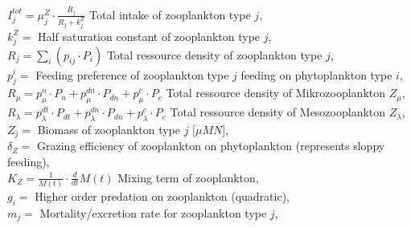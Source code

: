\mbox{} \hspace{.5cm} $I^{tot}_j= \mu^{Z}_j \cdot \frac{R_{j}}{R_{j} + k^Z_j}$ Total intake of zooplankton type $j$,\\
\mbox{} \hspace{.5cm} $k^Z_j =$ Half saturation constant of zooplankton type $j$,\\
\mbox{} \hspace{.5cm} $R_{j}= \sum_{i} (p_{i j} \cdot P_{i})$ Total ressource density of zooplankton type $j$,\\
\mbox{} \hspace{.5cm} $p^i_{j}=$ Feeding preference of zooplankton type $j$ feeding on phytoplankton type $i$,\\
\mbox{} \hspace{.5cm} $R_{\mu}= p^n_{\mu} \cdot P_{n} + p^{dn}_{\mu} \cdot P_{dn} + p^c_{\mu} \cdot P_{c}$ Total ressource density of Mikrozooplankton $Z_{\mu}$,\\
\mbox{} \hspace{.5cm} $R_{\lambda}= p^{dt}_{\lambda} \cdot P_{dt} + p^{dn}_{\lambda} \cdot P_{dn} + p^c_{\lambda} \cdot P_{c}$ Total ressource density of Mesozooplankton $Z_{\lambda}$,\\



\mbox{} \hspace{.5cm} $Z_j=$ Biomass of zooplankton type $j$ [$\mu M N$],\\
\mbox{} \hspace{.5cm} $\delta_{Z}=$ Grazing efficiency of zooplankton on phytoplankton (represents sloppy feeding), \\
\mbox{} \hspace{.5cm} $K_{Z}=\frac{1}{M(t)} \cdot \frac{d}{d t} M(t)$ Mixing term of zooplankton, \\
\mbox{} \hspace{.5cm} $g_{i}=$ Higher order predation on zooplankton (quadratic), \\
\mbox{} \hspace{.5cm} $m_{j}=$ Mortality/excretion rate for zooplankton type $j$,\\



\vspace{.2cm}
%
%
%
%

